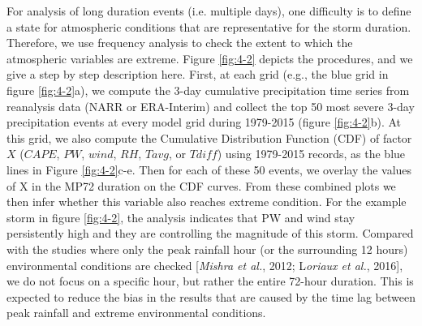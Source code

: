 For analysis of long duration events (i.e. multiple days), one difficulty is to define a state for atmospheric conditions that are representative for the storm duration. Therefore, we use frequency analysis to check the extent to which the atmospheric variables are extreme. Figure \ref{fig:4-2} depicts the procedures, and we give a step by step description here. First, at each grid (e.g., the blue grid in figure \ref{fig:4-2}a), we compute the 3-day cumulative precipitation time series from reanalysis data (NARR or ERA-Interim) and collect the top 50 most severe 3-day precipitation events at every model grid during 1979-2015 (figure \ref{fig:4-2}b). At this grid, we also compute the Cumulative Distribution Function (CDF) of factor $X$ ($CAPE$, $PW$, $wind$, $RH$, $Tavg$, or $Tdiff$) using 1979-2015 records, as the blue lines in Figure \ref{fig:4-2}c-e. Then for each of these 50 events, we overlay the values of X in the MP72 duration on the CDF curves. From these combined plots we then infer whether this variable also reaches extreme condition. For the example storm in figure \ref{fig:4-2}, the analysis indicates that PW and wind stay persistently high and they are controlling the magnitude of this storm. Compared with the studies where only the peak rainfall hour (or the surrounding 12 hours) environmental conditions are checked [\textit{Mishra et al.}, 2012; L\textit{oriaux et al.}, 2016], we do not focus on a specific hour, but rather the entire 72-hour duration. This is expected to reduce the bias in the results that are caused by the time lag between peak rainfall and extreme environmental conditions.

